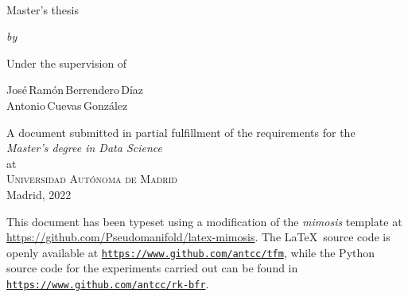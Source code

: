 
\begin{titlepage}
  \vspace*{5cm}
  \makeatletter
  \begin{center}
    \begin{singlespace*}
    \begin{Huge}
      \@title
    \end{Huge}\\[1cm]
    \begin{large}
      Master's thesis
    \end{large}
    \vskip 0.1cm
    \emph{by}
    \vskip 0.18cm
    \begin{Large}
    \textsc{\@author}
  \end{Large}
  \end{singlespace*}
    \vfill

    Under the supervision of
    \begin{large}
    \vskip 0.1cm
    José\,Ramón\,Berrendero\,Díaz\\
    Antonio\,Cuevas\,González\\[1cm]
  \end{large}

    A document submitted in partial fulfillment
    of the requirements for the\\
    \emph{Master's degree in Data Science}\\
    at\\
    \textsc{Universidad Autónoma de Madrid}\\[1cm]

    Madrid, 2022
  \end{center}
  \makeatother
\end{titlepage}
\newpage





\thispagestyle{empty}
\pagebreak
\hspace{0pt}
\vfill
\begin{center}
    \begin{minipage}[t]{12.5cm}
        \doclicenseThis
        This document has been typeset using a modification of the \textit{mimosis} template at \url{https://github.com/Pseudomanifold/latex-mimosis}. The \LaTeX\ source code is openly available at \texttt{\url{https://www.github.com/antcc/tfm}}, while the Python source code for the experiments carried out can be found in \texttt{\url{https://www.github.com/antcc/rk-bfr}}.
    \end{minipage}
\end{center}
\vfill
\hspace{0pt}
\pagebreak
\newpage

